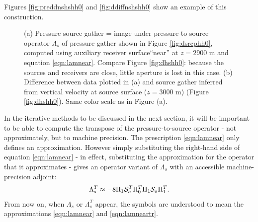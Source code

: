 \documentclass[12pt]{geophysics}
\begin{document}
Figures
\ref{fig:preddnshshh0} and \ref{fig:ddiffnshshh0} show an example of
this construction.

\begin{figure}
  \centering
  \caption{(a) Pressure source gather = image
  under pressure-to-source operator $\Lambda_s$ of pressure gather
  shown in Figure \ref{fig:dsrcphh0}, computed using
  auxiliary receiver surface``near''  at $z=2900$ m and equation \ref{eqn:lamnear}. Compare Figure
  \ref{fig:dhshh0}: because the sources and
  receivers are close, little aperture is lost in this case. (b)
  Difference between data plotted in (a)
  and source gather
  inferred from vertical velocity at source
  surface ($z=3000$ m) (Figure \ref{fig:dhshh0}). Same color scale as in Figure
  (a).}
\end{figure}

In the iterative methods to be discussed in the next section, it will
be important to be able to compute the transpose of the
pressure-to-source operator - not approximately, but to machine
precision. The prescription \ref{eqn:lamnear} only
defines an approximation. However simply substituting the right-hand
side of equation \ref{eqn:lamnear} - in effect, substituting the
approximation for the operator that it approximates - gives an
operator variant of $\Lambda_s$ with an accessible
machine-precision adjoint:
\begin{equation}
  \label{eqn:lamneartr}
 \Lambda_s^T \approx -8\Pi_1{\cal S}_a^T\Pi_0^T\Pi_1 {\cal S}_a\Pi_1^T. 
\end{equation}
From now on, when $\Lambda_s$ or $\Lambda_s^T$ appear, the symbols are
understood to mean the approximations \ref{eqn:lamnear} and
\ref{eqn:lamneartr}.
\end{document}
